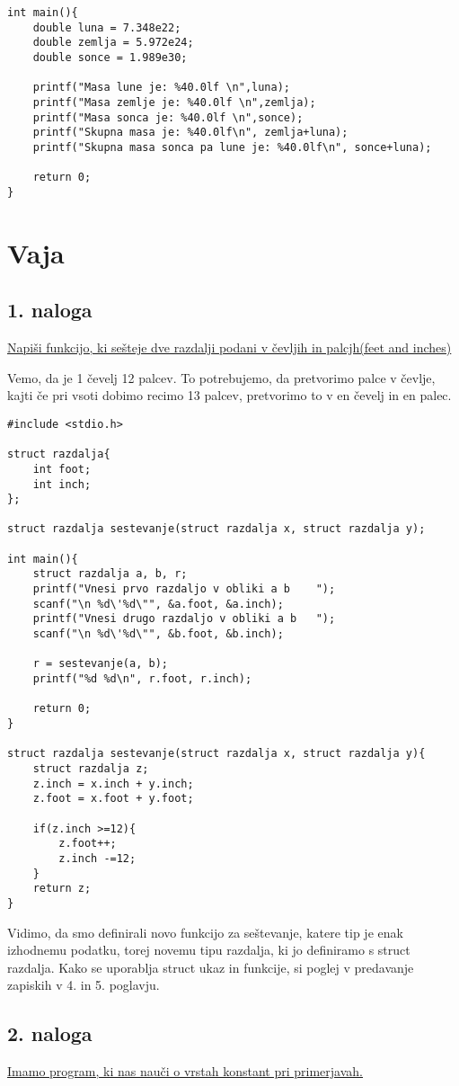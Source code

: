 \documentclass[a4paper, 12pt]{article}
\begin{document}
\begin{lstlisting}
int main(){
	double luna = 7.348e22;
	double zemlja = 5.972e24;
	double sonce = 1.989e30;
	
	printf("Masa lune je: %40.0lf \n",luna);
	printf("Masa zemlje je: %40.0lf \n",zemlja);
	printf("Masa sonca je: %40.0lf \n",sonce);
	printf("Skupna masa je: %40.0lf\n", zemlja+luna);
	printf("Skupna masa sonca pa lune je: %40.0lf\n", sonce+luna);
	
	return 0;
}
\end{lstlisting}

\section{Vaja}
\subsection*{1. naloga}

\underline{Napiši funkcijo, ki sešteje dve razdalji podani v čevljih in palcjh(feet and inches)}\

Vemo, da je 1 čevelj 12 palcev. To potrebujemo, da pretvorimo palce v čevlje, kajti če pri vsoti dobimo recimo 13 palcev, pretvorimo to v en čevelj in en palec.
\pagebreak
\begin{lstlisting}
#include <stdio.h>

struct razdalja{
	int foot;
	int inch;
};

struct razdalja sestevanje(struct razdalja x, struct razdalja y);

int main(){
	struct razdalja a, b, r;
	printf("Vnesi prvo razdaljo v obliki a b	");
	scanf("\n %d\'%d\"", &a.foot, &a.inch);
	printf("Vnesi drugo razdaljo v obliki a b	");
	scanf("\n %d\'%d\"", &b.foot, &b.inch);

	r = sestevanje(a, b);
	printf("%d %d\n", r.foot, r.inch);

	return 0;
}	

struct razdalja sestevanje(struct razdalja x, struct razdalja y){
	struct razdalja z;
	z.inch = x.inch + y.inch;
	z.foot = x.foot + y.foot;

	if(z.inch >=12){
		z.foot++;
		z.inch -=12;
	}
	return z;
}
\end{lstlisting}
Vidimo, da smo definirali novo funkcijo za seštevanje, katere tip je enak izhodnemu podatku, torej novemu tipu razdalja, ki jo definiramo s struct razdalja. Kako se uporablja struct ukaz in funkcije, si poglej v predavanje zapiskih v 4. in 5. poglavju.
\pagebreak
\subsection*{2. naloga}
\underline{Imamo program, ki nas nauči o vrstah konstant pri primerjavah.}\
\end{document}
